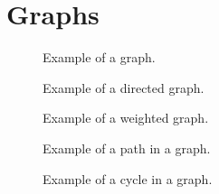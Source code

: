 \section{Graphs}

\begin{figure}[tbp]
  
  \caption{Example of a graph.}
  \label{fig:bs:graphs:graph}
\end{figure}

\begin{figure}[tbp]
  
  \caption{Example of a directed graph.}
  \label{fig:bs:graphs:directed}
\end{figure}

\begin{figure}[tbp]
  
  \caption{Example of a weighted graph.}
  \label{fig:bs:graphs:weighted}
\end{figure}

\begin{figure}[tbp]
  
  \caption{Example of a path in a graph.}
  \label{fig:bs:graphs:path}
\end{figure}

\begin{figure}[tbp]
  
  \caption{Example of a cycle in a graph.}
  \label{fig:bs:graphs:cycle}
\end{figure}

